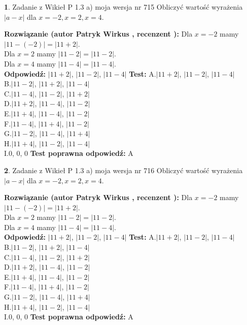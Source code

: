 \documentclass[12pt, a4paper]{article}
\theoremstyle{definition} %
\newtheorem{zad}{}
\newcommand{\zadStart}[1]{\begin{zad}#1\newline}
\newcommand{\zadStop}{\end{zad}}
\newcommand{\rozwStart}[2]{\noindent \textbf{Rozwiązanie (autor #1 , recenzent #2): }\newline}
\newcommand{\rozwStop}{\newline}
\newcommand{\odpStart}{\noindent \textbf{Odpowiedź:}\newline}
\newcommand{\odpStop}{\newline}
\newcommand{\testStart}{\noindent \textbf{Test:}\newline}
\newcommand{\testStop}{\newline}
\newcommand{\kluczStart}{\noindent \textbf{Test poprawna odpowiedź:}\newline}
\newcommand{\kluczStop}{\newline}
\begin{document}
\zadStart{Zadanie z Wikieł P 1.3 a) moja wersja nr 715}
Obliczyć wartość wyrażenia $|a - x|$ dla $x=-2,x=2,x=4$.
\zadStop
\rozwStart{Patryk Wirkus}{}
Dla $x = -2$ mamy $|11 - (-2)| = |11 + 2|$.\\
Dla $x = 2$ mamy $|11 - 2| = |11 - 2|$.\\
Dla $x = 4$ mamy $|11 - 4| = |11 - 4|$.\\
\rozwStop
\odpStart
$|11 + 2|$, $|11 - 2|$, $|11 - 4|$
\odpStop
\testStart
A.$|11 + 2|$, $|11 - 2|$, $|11 - 4|$\\
B.$|11 - 2|$, $|11 + 2|$, $|11 - 4|$\\
C.$|11 - 4|$, $|11 - 2|$, $|11 + 2|$\\
D.$|11 + 2|$, $|11 - 4|$, $|11 - 2|$\\
E.$|11 + 4|$, $|11 - 4|$, $|11 - 2|$\\
F.$|11 - 4|$, $|11 + 4|$, $|11 - 2|$\\
G.$|11 - 2|$, $|11 - 4|$, $|11 + 4|$\\
H.$|11 + 4|$, $|11 - 2|$, $|11 - 4|$\\
I.$0$, $0$, $0$
\testStop
\kluczStart
A
\kluczStop



\zadStart{Zadanie z Wikieł P 1.3 a) moja wersja nr 716}
Obliczyć wartość wyrażenia $|a - x|$ dla $x=-2,x=2,x=4$.
\zadStop
\rozwStart{Patryk Wirkus}{}
Dla $x = -2$ mamy $|11 - (-2)| = |11 + 2|$.\\
Dla $x = 2$ mamy $|11 - 2| = |11 - 2|$.\\
Dla $x = 4$ mamy $|11 - 4| = |11 - 4|$.\\
\rozwStop
\odpStart
$|11 + 2|$, $|11 - 2|$, $|11 - 4|$
\odpStop
\testStart
A.$|11 + 2|$, $|11 - 2|$, $|11 - 4|$\\
B.$|11 - 2|$, $|11 + 2|$, $|11 - 4|$\\
C.$|11 - 4|$, $|11 - 2|$, $|11 + 2|$\\
D.$|11 + 2|$, $|11 - 4|$, $|11 - 2|$\\
E.$|11 + 4|$, $|11 - 4|$, $|11 - 2|$\\
F.$|11 - 4|$, $|11 + 4|$, $|11 - 2|$\\
G.$|11 - 2|$, $|11 - 4|$, $|11 + 4|$\\
H.$|11 + 4|$, $|11 - 2|$, $|11 - 4|$\\
I.$0$, $0$, $0$
\testStop
\kluczStart
A
\kluczStop
\end{document}
